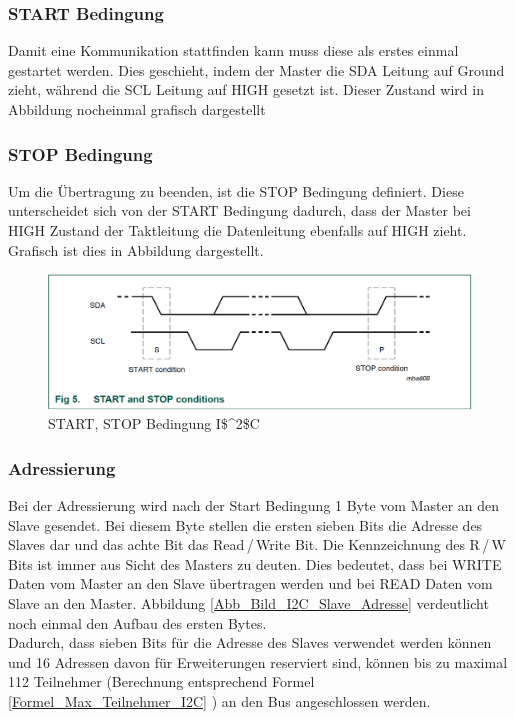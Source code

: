 \subsubsection*{START Bedingung}
\label{subsubsection_START_Bedingung}
Damit eine Kommunikation stattfinden kann muss diese als erstes einmal gestartet werden. Dies geschieht, indem der Master die SDA Leitung auf Ground zieht, während die SCL Leitung auf HIGH gesetzt ist. Dieser Zustand wird in Abbildung nocheinmal grafisch dargestellt

\subsubsection*{STOP Bedingung}
\label{subsubsection_STOP_Bedingung}
Um die Übertragung zu beenden, ist die STOP Bedingung definiert. Diese unterscheidet sich von der START Bedingung dadurch, dass der Master bei HIGH Zustand der Taktleitung die Datenleitung ebenfalls auf HIGH zieht. Grafisch ist dies in Abbildung dargestellt.

\begin{figure}[!h] 
  \centering
     \includegraphics[scale=.65]{BilderAllgemein/I2C_START_STOP.png}
  \caption{START, STOP Bedingung \ac{I$^2$C}  \citep[S. 9]{I2C_Datenblatt}}
  \label{Abb_Bild_I2C_START_STOP}
\end{figure}

\subsubsection*{Adressierung}
\label{subsubsection_Adressierung}
Bei der Adressierung wird nach der Start Bedingung 1 Byte vom Master an den Slave gesendet. Bei diesem Byte stellen die ersten sieben Bits die Adresse des Slaves dar und das achte Bit das Read\,/\,Write Bit. Die Kennzeichnung des R\,/\,W Bits ist immer aus Sicht des Masters zu deuten. Dies bedeutet, dass bei WRITE Daten vom Master an den Slave übertragen werden und bei READ Daten vom Slave an den Master.
Abbildung \ref{Abb_Bild_I2C_Slave_Adresse} verdeutlicht noch einmal den Aufbau des ersten Bytes.\\ Dadurch, dass sieben Bits für die Adresse des Slaves verwendet werden können und 16 Adressen davon für Erweiterungen reserviert sind, können bis zu maximal 112 Teilnehmer (Berechnung entsprechend Formel \ref{Formel_Max_Teilnehmer_I2C} ) an den Bus angeschlossen werden.

